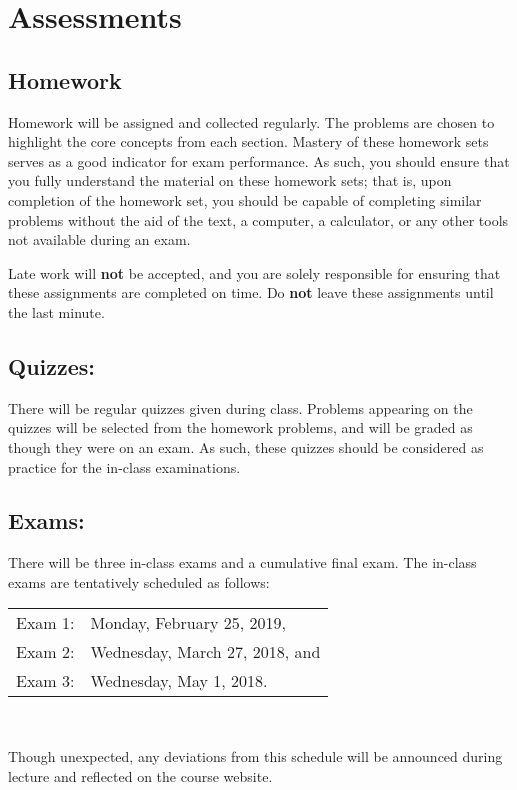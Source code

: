 \documentclass[12pt]{amsart}
\begin{document}
\section*{Assessments}
\subsection*{Homework}

\noindent
Homework will be assigned and collected regularly.
The problems are chosen to highlight the core concepts from each section.
Mastery of these homework sets serves as a good indicator for exam performance.
As such, you should ensure that you fully understand the material on these homework sets; that is, upon completion of the homework set, you should be capable of completing similar problems without the aid of the text, a computer, a calculator, or any other tools not available during an exam.

Late work will {\bf not} be accepted, and you are solely responsible for ensuring that these assignments are completed on time.
Do {\bf not} leave these assignments until the last minute.

\subsection*{Quizzes:}

\noindent
There will be regular quizzes given during class.
Problems appearing on the quizzes will be selected from the homework problems, and will be graded as though they were on an exam.
As such, these quizzes should be considered as practice for the in-class examinations.

\subsection*{Exams:}
\noindent There will be three in-class exams and a cumulative final exam.
The in-class exams are tentatively scheduled as follows:
\begin{center}
  \begin{tabular}{ll}
    Exam 1: & Monday, February 25, 2019,\\
    Exam 2: & Wednesday, March 27, 2018, and\\
    Exam 3: & Wednesday, May 1, 2018.\\
  \end{tabular}\\
\end{center}
Though unexpected, any deviations from this schedule will be announced during lecture and reflected on the course website.
\end{document}

